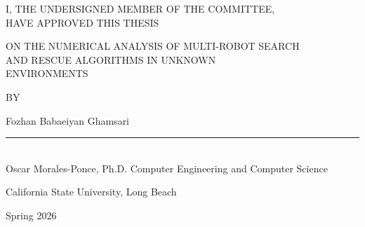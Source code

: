 \thispagestyle{empty}
\begin{doublespacing}
\begin{center}
\normalfont
\vspace*{0.5in}
I, THE UNDERSIGNED MEMBER OF THE COMMITTEE,\\
HAVE APPROVED THIS THESIS

\vspace{0.5in}
ON THE NUMERICAL ANALYSIS OF MULTI-ROBOT SEARCH\\
AND RESCUE ALGORITHMS IN UNKNOWN\\
ENVIRONMENTS

\vspace{0.5in}
BY

\vspace{0.25in}
Fozhan Babaeiyan Ghamsari

\vspace{0.75in}
\begin{minipage}{\linewidth}
\centering
\rule{\linewidth}{0.4pt}\\[3pt]
\noindent Oscar Morales-Ponce, Ph.D. \hfill Computer Engineering and Computer Science
\end{minipage}

\vspace{0.75in}
California State University, Long Beach

\vspace{0.25in}
Spring 2026
\end{center}
\end{doublespacing}
\pagestyle{plain}
\clearpage

